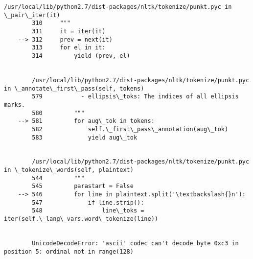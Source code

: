 \documentclass[11pt]{article}
\begin{document}
\begin{Verbatim}[commandchars=\\\{\}]
        /usr/local/lib/python2.7/dist-packages/nltk/tokenize/punkt.pyc in \_pair\_iter(it)
        310     """
        311     it = iter(it)
    --> 312     prev = next(it)
        313     for el in it:
        314         yield (prev, el)


        /usr/local/lib/python2.7/dist-packages/nltk/tokenize/punkt.pyc in \_annotate\_first\_pass(self, tokens)
        579           - ellipsis\_toks: The indices of all ellipsis marks.
        580         """
    --> 581         for aug\_tok in tokens:
        582             self.\_first\_pass\_annotation(aug\_tok)
        583             yield aug\_tok


        /usr/local/lib/python2.7/dist-packages/nltk/tokenize/punkt.pyc in \_tokenize\_words(self, plaintext)
        544         """
        545         parastart = False
    --> 546         for line in plaintext.split('\textbackslash{}n'):
        547             if line.strip():
        548                 line\_toks = iter(self.\_lang\_vars.word\_tokenize(line))


        UnicodeDecodeError: 'ascii' codec can't decode byte 0xc3 in position 5: ordinal not in range(128)

    \end{Verbatim}


    
    
    
    
\end{document}
